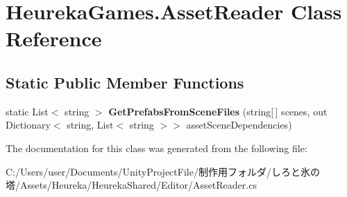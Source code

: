 \hypertarget{class_heureka_games_1_1_asset_reader}{}\section{Heureka\+Games.\+Asset\+Reader Class Reference}
\label{class_heureka_games_1_1_asset_reader}
\subsection*{Static Public Member Functions}
\begin{DoxyCompactItemize}
\item 
\mbox{\label{class_heureka_games_1_1_asset_reader_a9bee0f498855995b3fa10d3c79228aa3}} 
static List$<$ string $>$ {\bfseries Get\+Prefabs\+From\+Scene\+Files} (string\mbox{[}$\,$\mbox{]} scenes, out Dictionary$<$ string, List$<$ string $>$$>$ asset\+Scene\+Dependencies)
\end{DoxyCompactItemize}


The documentation for this class was generated from the following file\+:\begin{DoxyCompactItemize}
\item 
C\+:/\+Users/user/\+Documents/\+Unity\+Project\+File/制作用フォルダ/しろと氷の塔/\+Assets/\+Heureka/\+Heureka\+Shared/\+Editor/Asset\+Reader.\+cs\end{DoxyCompactItemize}

